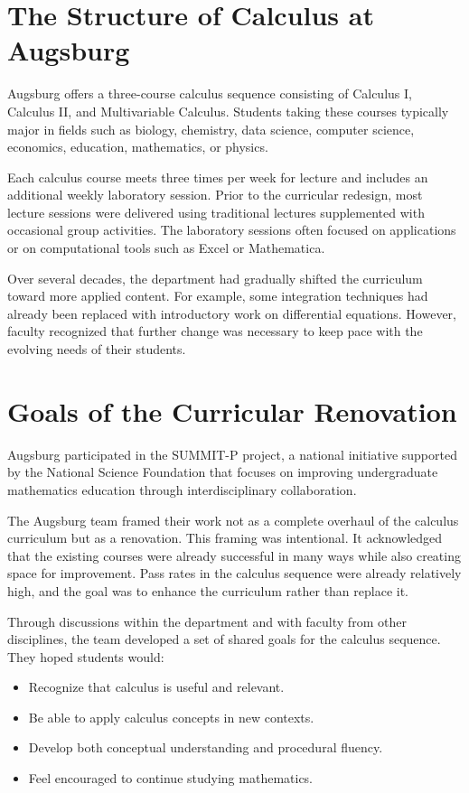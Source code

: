 \documentclass[11pt]{article}
\begin{document}
\section*{The Structure of Calculus at Augsburg}

Augsburg offers a three-course calculus sequence consisting of Calculus I, Calculus II, and Multivariable Calculus. Students taking these courses typically major in fields such as biology, chemistry, data science, computer science, economics, education, mathematics, or physics.

Each calculus course meets three times per week for lecture and includes an additional weekly laboratory session. Prior to the curricular redesign, most lecture sessions were delivered using traditional lectures supplemented with occasional group activities. The laboratory sessions often focused on applications or on computational tools such as Excel or Mathematica.

Over several decades, the department had gradually shifted the curriculum toward more applied content. For example, some integration techniques had already been replaced with introductory work on differential equations. However, faculty recognized that further change was necessary to keep pace with the evolving needs of their students.

\section*{Goals of the Curricular Renovation}

Augsburg participated in the SUMMIT-P project, a national initiative supported by the National Science Foundation that focuses on improving undergraduate mathematics education through interdisciplinary collaboration.

The Augsburg team framed their work not as a complete overhaul of the calculus curriculum but as a renovation. This framing was intentional. It acknowledged that the existing courses were already successful in many ways while also creating space for improvement. Pass rates in the calculus sequence were already relatively high, and the goal was to enhance the curriculum rather than replace it.

Through discussions within the department and with faculty from other disciplines, the team developed a set of shared goals for the calculus sequence. They hoped students would:

\begin{itemize}
\item Recognize that calculus is useful and relevant.
\item Be able to apply calculus concepts in new contexts.
\item Develop both conceptual understanding and procedural fluency.
\item Feel encouraged to continue studying mathematics.
\end{itemize}
\end{document}
